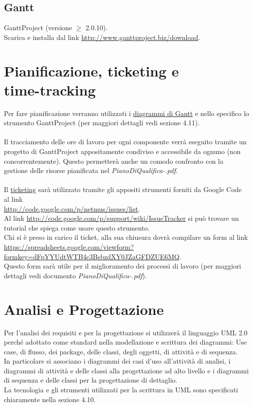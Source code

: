 \section{Gantt}
GanttProject (versione $\geq$ 2.0.10). 
\\
Scarica e installa dal link
\url{http://www.ganttproject.biz/download}.


\chapter{Pianificazione, ticketing e \\time-tracking}
\thispagestyle{fancy}
Per fare pianificazione verranno utilizzati i \underline{diagrammi di Gantt} e
nello specifico lo strumento GanttProject (per maggiori dettagli vedi sezione 4.11). 
\\ \\
Il tracciamento delle ore di lavoro per ogni componente verr\`a eseguito
tramite un progetto di GanttProject appositamente condiviso e accessibile da ognuno (non concorrentemente). Questo permetter\`a anche un comodo confronto con la
gestione delle risorse pianificata nel \emph{PianoDiQualifica-\versionePQ.pdf}.
\\ \\
Il \underline{ticketing} sar\`a utilizzato tramite gli appositi strumenti
forniti da Google Code al link
\\\url{http://code.google.com/p/netmus/issues/list}. \\Al link
\url{http://code.google.com/p/support/wiki/IssueTracker} si pu\`o trovare un tutorial che spiega come usare questo strumento.\\
Chi si \`e preso in carico il ticket, alla sua chiusura dovr\`a
compilare un form al link
\url{https://spreadsheets.google.com/viewform?formkey=dFpYYUdtWTB4c3BsbzdXY0JZaGFDZUE6MQ}.
\\Questo form sar\`a utile per il miglioramento dei processi di lavoro (per
maggiori dettagli vedi documento \emph{PianoDiQualifica-\versionePQ.pdf}).


\chapter{Analisi e Progettazione}
\thispagestyle{fancy} 

Per l'analisi dei requisiti e per la progettazione si utilizzer\`a il linguaggio
UML 2.0 perch\'e adottato come standard nella modellazione e
scrittura dei diagrammi: Use case, di flusso, dei package, delle classi, degli
oggetti, di attivit\`a e di sequenza. \\
In particolare si associano i diagrammi dei casi d'uso all'attivit\`a di
analisi, i diagrammi di attivit\`a e delle classi alla progettazione ad alto
livello e i diagrammi di sequenza e delle classi per la progettazione di
dettaglio. \\
La tecnologia e gli strumenti utilizzati per la scrittura in UML sono
specificati chiaramente nella sezione 4.10.

